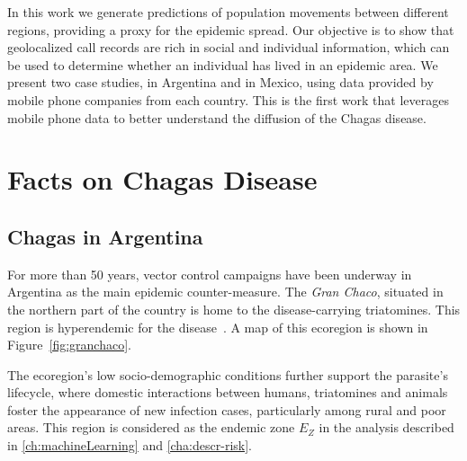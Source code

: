  In this work we generate predictions of population movements between different regions, providing a proxy for the epidemic spread. Our objective is to show that geolocalized call records are rich in social and individual information, which can be used to determine whether an individual has lived in an epidemic area. We present two case studies, in Argentina and in Mexico, using data provided by mobile phone companies from each country. %
This is the first work that leverages mobile phone data to better understand the diffusion of the Chagas disease.




\section{Facts on Chagas Disease}

\subsection{Chagas in  Argentina}\label{endemic_zone_argentina}

For more than 50 years, vector control campaigns have been underway in Argentina as the main epidemic counter-measure. The \textit{Gran Chaco}, situated in the northern part of the country is home to the disease-carrying triatomines. This region is hyperendemic for the disease~\textcite{OPS2014mapa}. A map of this ecoregion is shown in Figure~\cref{fig:granchaco}.

The ecoregion's low socio-demographic conditions further support the parasite's lifecycle, where domestic interactions between humans, triatomines and animals foster the appearance of new infection cases, particularly among rural and poor areas.
This region is considered as the endemic zone $E_Z$ in the analysis described in \cref{ch:machineLearning} and \cref{cha:descr-risk}.


